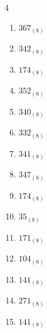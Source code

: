 \begin{multicols}{4}
\begin{enumerate}
        \phantom{$=74$}

  \item $367_{(8)}$

        \phantom{$=247$}

  \item $342_{(8)}$

        \phantom{$=226$}

  \item $174_{(8)}$

        \phantom{$=124$}

  \item $352_{(8)}$

        \phantom{$=234$}

  \item $340_{(8)}$

        \phantom{$=224$}

  \item $332_{(8)}$

        \phantom{$=218$}

  \item $341_{(8)}$

        \phantom{$=225$}

  \item $347_{(8)}$

        \phantom{$=231$}

  \item $174_{(8)}$

        \phantom{$=124$}

  \item $35_{(8)}$

        \phantom{$=29$}

  \item $171_{(8)}$

        \phantom{$=121$}

  \item $104_{(8)}$

        \phantom{$=68$}

  \item $141_{(8)}$

        \phantom{$=97$}

  \item $271_{(8)}$

        \phantom{$=185$}

\columnbreak %

  \item $141_{(8)}$

        \phantom{$=97$}


\end{enumerate}
\end{multicols}
